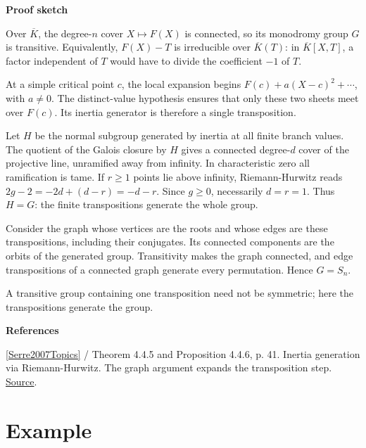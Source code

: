\documentclass[11pt,a4paper,oneside,openany]{book}
\newenvironment{sources}{\par\smallskip\begingroup\footnotesize\color{atlasgray}\leftskip=10pt\setlength{\parskip}{2pt}}{\par\endgroup\smallskip}
\begin{document}
\begin{atlasblock}[standard]
\textbf{\sffamily Proof sketch}\par\smallskip
\color{black} Over \(\overline K\), the degree-\(n\) cover \(X\mapsto F(X)\) is connected, so its monodromy group \(G\) is transitive. Equivalently, \(F(X)-T\) is irreducible over \(\overline K(T)\): in \(\overline K[X,T]\), a factor independent of \(T\) would have to divide the coefficient \(-1\) of \(T\).\par
\color{black} At a simple critical point \(c\), the local expansion begins \(F(c)+a(X-c)^2+\cdots\), with \(a\ne0\). The distinct-value hypothesis ensures that only these two sheets meet over \(F(c)\). Its inertia generator is therefore a single transposition.\par
\color{black} Let \(H\) be the normal subgroup generated by inertia at all finite branch values. The quotient of the Galois closure by \(H\) gives a connected degree-\(d\) cover of the projective line, unramified away from infinity. In characteristic zero all ramification is tame. If \(r\ge1\) points lie above infinity, Riemann-Hurwitz reads \(2g-2=-2d+(d-r)=-d-r\). Since \(g\ge0\), necessarily \(d=r=1\). Thus \(H=G\): the finite transpositions generate the whole group.\par
\color{black} Consider the graph whose vertices are the roots and whose edges are these transpositions, including their conjugates. Its connected components are the orbits of the generated group. Transitivity makes the graph connected, and edge transpositions of a connected graph generate every permutation. Hence \(G=S_n\).\par
\end{atlasblock}\color{black}
\color{black} A transitive group containing one transposition need not be symmetric; here the transpositions generate the group.\par
\begin{sources}
\textbf{References}\par\smallskip
\noindent\hyperlink{ref:Serre2007Topics}{[Serre2007Topics]} / Theorem 4.4.5 and Proposition 4.4.6, p. 41. Inertia generation via Riemann-Hurwitz. The graph argument expands the transposition step. \href{https://www.routledge.com/Topics-in-Galois-Theory-2nd-Edition/Serre/p/book/9780429064401}{Source}.\par
\end{sources}\color{black}
\section{Example}
\end{document}
